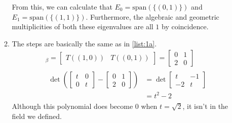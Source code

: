 \documentclass[12pt]{article}
\begin{document}
\begin{enumerate}
\begin{enumerate}
                        From this, we can calculate that
                        $E_0=\text{span}(\{(0, 1)\})$ and $E_1=\text{span}(\{(1,1)\})$.
                        Furthermore, the algebraic and geometric multiplicities
                        of both these eigenvalues are all $1$ by coincidence. \label{list:1a}
                  \item The steps are basically the same as in \ref{list:1a}.
                        \begin{gather*}
                              [T]_\beta=\begin{bmatrix}
                                    T((1, 0)) & T((0, 1))
                              \end{bmatrix}=\begin{bmatrix}
                                    0 & 1 \\
                                    2 & 0
                              \end{bmatrix} \\
                              \begin{aligned}
                                    \det \left(\begin{bmatrix}
                                                     t & 0 \\
                                                     0 & t
                                               \end{bmatrix}-\begin{bmatrix}
                                                                   0 & 1 \\
                                                                   2 & 0
                                                             \end{bmatrix}\right)
                                     & = \det \begin{bmatrix}
                                                    t  & -1 \\
                                                    -2 & t
                                              \end{bmatrix} \\
                                     & = t^2-2
                              \end{aligned}
                        \end{gather*}
                        Although this polynomial does become $0$ when $t=\sqrt{2}$,
                        it isn't in the field we defined.

\end{enumerate}
\end{enumerate}
\end{document}
